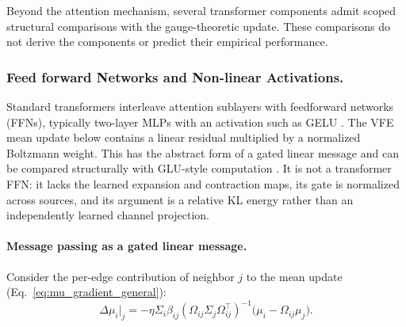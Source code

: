 \documentclass[twoside,11pt]{article}
\begin{document}
Beyond the attention mechanism, several transformer components admit scoped structural comparisons with the gauge-theoretic update. These comparisons do not derive the components or predict their empirical performance.

\subsubsection{Feed forward Networks and Non-linear Activations.}
\label{sec:ffn_nonlinearity}

Standard transformers interleave attention sublayers with feedforward networks (FFNs), typically two-layer MLPs with an activation such as GELU \citep{hendrycks2016gaussian}. The VFE mean update below contains a linear residual multiplied by a normalized Boltzmann weight. This has the abstract form of a gated linear message and can be compared structurally with GLU-style computation \citep{dauphin2017language}. It is not a transformer FFN: it lacks the learned expansion and contraction maps, its gate is normalized across sources, and its argument is a relative KL energy rather than an independently learned channel projection.

\paragraph{Message passing as a gated linear message.}

Consider the per-edge contribution of neighbor $j$ to the mean update (Eq.~\ref{eq:mu_gradient_general}):
%
\begin{equation}
\Delta\mu_i\big|_j = -\eta \Sigma_i \beta_{ij} (\Omega_{ij}\Sigma_j\Omega_{ij}^\top)^{-1}\bigl(\mu_i - \Omega_{ij}\mu_j\bigr).
\label{eq:glu_message}
\end{equation}
%
\end{document}
